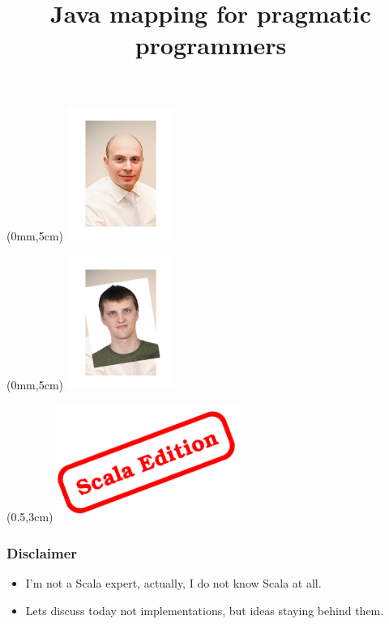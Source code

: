 \documentclass[14pt]{beamer}
\begin{document}
\title{Java mapping for pragmatic programmers}

\newcommand{\smaller}[1] {
  {\scriptsize {#1}}
}

\begin{frame}[t]
    \titlepage
    \begin{textblock*}{20mm}(0mm,5cm)%
      \includegraphics[width=35mm]{start1.png}
    \end{textblock*}
\end{frame}

\begin{frame}[t]
    \titlepage
    \begin{textblock*}{20mm}(0mm,5cm)%
      \includegraphics[width=35mm]{start2.png}
    \end{textblock*}
    \begin{textblock*}{20mm}(0.5\textwidth,3cm)%
      \includegraphics[width=6cm]{stamp.png}
    \end{textblock*}
\end{frame}

\frame
{\frametitle{Disclaimer}
\begin{itemize}
  \item<2-> I'm not a Scala expert, actually, I do not know Scala at all.
  \item<3-> Lets discuss today not implementations, but ideas staying behind them.
\end{itemize}
}
\end{document}
